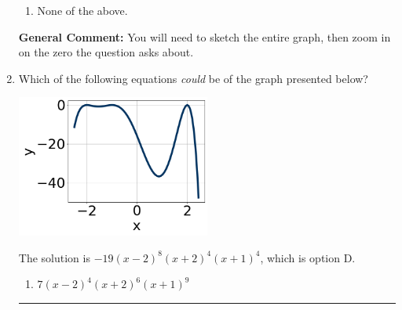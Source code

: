 \documentclass{extbook}[14pt]
\newcommand{\litem}[1]{\item #1

\rule{\textwidth}{0.4pt}}
\begin{document}
\begin{enumerate}
{\begin{enumerate}[label=\Alph*.]
\item None of the above.\end{enumerate}
\textbf{General Comment:} You will need to sketch the entire graph, then zoom in on the zero the question asks about.
}
\litem{
Which of the following equations \textit{could} be of the graph presented below?

\begin{center}
    \includegraphics[width=0.5\textwidth]{../Figures/polyGraphToFunctionC.png}
\end{center}




The solution is \( -19(x - 2)^{8} (x + 2)^{4} (x + 1)^{4} \), which is option D.\begin{enumerate}[label=\Alph*.]
\item \( 7(x - 2)^{4} (x + 2)^{6} (x + 1)^{9} \)


\end{enumerate}}
\end{enumerate}
\end{document}
